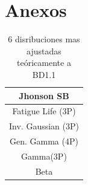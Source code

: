 \documentclass[12pt]{report}
\begin{document}
\appendix
\chapter{Anexos}
\begin{table}[h!]
	\centering
	\begin{tabular}{|c|}
		\hline
		   Jhonson SB    \\
		\hline
		Fatigue Life (3P)      \\ \hline
		Inv. Gaussian (3P)      \\ \hline 
		Gen. Gamma (4P)    \\ \hline
		Gamma(3P)     \\ \hline
		Beta     \\ \hline
		\hline
	\end{tabular}
	\caption{6 disribuciones mas ajustadas teóricamente a BD1.1}
	\label{teo_BD1.1}
\end{table}
\end{document}
